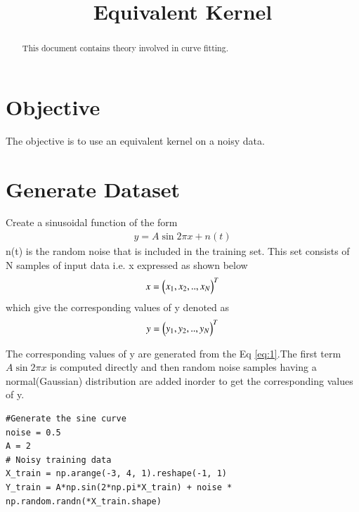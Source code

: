 \documentclass[journal,12pt,twocolumn]{IEEEtran}
\begin{document}
\makeatletter
{}
\makeatother
\let\StandardTheFigure\thefigure
\let\vec\mathbf
\renewcommand{\thefigure}{\theproblem}
\def\putbox#1#2#3{\makebox[0in][l]{\makebox[#1][l]{}\raisebox{\baselineskip}[0in][0in]{\raisebox{#2}[0in][0in]{#3}}}}
     \def\rightbox#1{\makebox[0in][r]{#1}}
     \def\centbox#1{\makebox[0in]{#1}}
     \def\topbox#1{\raisebox{-\baselineskip}[0in][0in]{#1}}
\vspace{3cm}
\title{Equivalent Kernel}
\maketitle
\newpage
\bigskip
\renewcommand{\thefigure}{\theenumi}
\renewcommand{\thetable}{\theenumi}
\begin{abstract}
This document contains theory involved in curve fitting.
\end{abstract}
\section{\textbf{Objective}}
The objective is to use an equivalent kernel on a noisy data.
\section{Generate Dataset}
Create a sinusoidal function of the form
\begin{align}
    y = A\sin{2\pi x} + n(t) \label{eq:1}
\end{align}
n(t) is the random noise that is included in the training set. This set consists of N samples of input data i.e. x expressed as shown below
\begin{align}
    x = \begin{pmatrix}x_{1}, x_{2}, .., x_{N}\end{pmatrix}^{T}
\end{align}
which give the corresponding values of y denoted as
\begin{align}
    y = \begin{pmatrix}y_{1}, y_{2}, .., y_{N}\end{pmatrix}^{T}
\end{align}

The corresponding values of y are generated from the Eq \eqref{eq:1}.The first term $A\sin{2\pi x}$ is computed directly and then random noise samples having a normal(Gaussian) distribution are added inorder to get the corresponding values of y.
\begin{lstlisting}
#Generate the sine curve 
noise = 0.5
A = 2  
# Noisy training data
X_train = np.arange(-3, 4, 1).reshape(-1, 1)
Y_train = A*np.sin(2*np.pi*X_train) + noise * np.random.randn(*X_train.shape)
\end{lstlisting}
\end{document}
